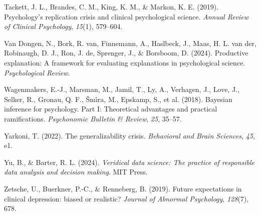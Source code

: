 \documentclass[
  letterpaper,
  DIV=11,
  numbers=noendperiod]{scrreprt}
\newlength{\cslhangindent}
\newenvironment{CSLReferences}[2] %
 {\begin{list}{}{%
  \setlength{\itemindent}{0pt}
  \setlength{\leftmargin}{0pt}
  \setlength{\parsep}{0pt}
  \ifodd #1
   \setlength{\leftmargin}{\cslhangindent}
   \setlength{\itemindent}{-1\cslhangindent}
  \fi
  \setlength{\itemsep}{#2\baselineskip}}}
 {\end{list}}
\theoremstyle{definition}
\theoremstyle{remark}
\begin{document}
\begin{CSLReferences}{1}{0}
Tackett, J. L., Brandes, C. M., King, K. M., \& Markon, K. E. (2019).
Psychology's replication crisis and clinical psychological science.
\emph{Annual Review of Clinical Psychology}, \emph{15}(1), 579--604.

Van Dongen, N., Bork, R. van, Finnemann, A., Haslbeck, J., Maas, H. L.
van der, Robinaugh, D. J., Ron, J. de, Sprenger, J., \& Borsboom, D.
(2024). Productive explanation: A framework for evaluating explanations
in psychological science. \emph{Psychological Review}.

Wagenmakers, E.-J., Marsman, M., Jamil, T., Ly, A., Verhagen, J., Love,
J., Selker, R., Gronau, Q. F., Šmı́ra, M., Epskamp, S., et al. (2018).
Bayesian inference for psychology. Part I: Theoretical advantages and
practical ramifications. \emph{Psychonomic Bulletin \& Review},
\emph{25}, 35--57.

Yarkoni, T. (2022). The generalizability crisis. \emph{Behavioral and
Brain Sciences}, \emph{45}, e1.

Yu, B., \& Barter, R. L. (2024). \emph{Veridical data science: The
practice of responsible data analysis and decision making}. MIT Press.

Zetsche, U., Buerkner, P.-C., \& Renneberg, B. (2019). Future
expectations in clinical depression: biased or realistic? \emph{Journal
of Abnormal Psychology}, \emph{128}(7), 678.

\end{CSLReferences}
\end{document}
